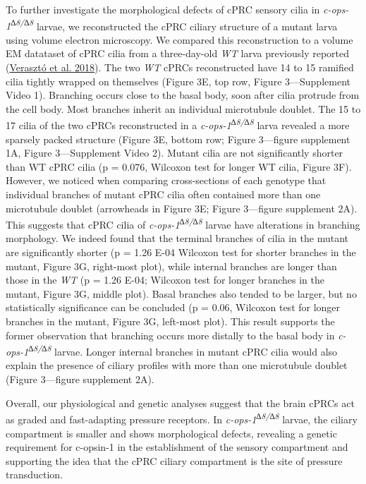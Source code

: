 \documentclass[
]{article}
\begin{document}
To further investigate the morphological defects of cPRC sensory cilia
in \emph{c-ops-1\textsuperscript{∆8/∆8}} larvae, we reconstructed the
cPRC ciliary structure of a mutant larva using volume electron
microscopy. We compared this reconstruction to a volume EM datataset of
cPRC cilia from a three-day-old \emph{WT} larva previously reported
(\protect\hyperlink{ref-veraszto2018}{Verasztó et al. 2018}). The two
\emph{WT} cPRCs reconstructed have 14 to 15 ramified cilia tightly
wrapped on themselves (Figure 3E, top row, Figure 3---Supplement Video
1). Branching occurs close to the basal body, soon after cilia protrude
from the cell body. Most branches inherit an individual microtubule
doublet. The 15 to 17 cilia of the two cPRCs reconstructed in a
\emph{c-ops-1\textsuperscript{∆8/∆8}} larva revealed a more sparsely
packed structure (Figure 3E, bottom row; Figure 3---figure supplement
1A, Figure 3---Supplement Video 2). Mutant cilia are not significantly
shorter than WT cPRC cilia (p = 0.076, Wilcoxon test for longer WT
cilia, Figure 3F). However, we noticed when comparing cross-sections of
each genotype that individual branches of mutant cPRC cilia often
contained more than one microtubule doublet (arrowheads in Figure 3E;
Figure 3---figure supplement 2A). This suggests that cPRC cilia of
\emph{c-ops-1\textsuperscript{∆8/∆8}} larvae have alterations in
branching morphology. We indeed found that the terminal branches of
cilia in the mutant are significantly shorter (p = 1.26 E-04 Wilcoxon
test for shorter branches in the mutant, Figure 3G, right-most plot),
while internal branches are longer than those in the \emph{WT} (p = 1.26
E-04; Wilcoxon test for longer branches in the mutant, Figure 3G, middle
plot). Basal branches also tended to be larger, but no statistically
significance can be concluded (p = 0.06, Wilcoxon test for longer
branches in the mutant, Figure 3G, left-most plot). This result supports
the former observation that branching occurs more distally to the basal
body in \emph{c-ops-1\textsuperscript{∆8/∆8}} larvae. Longer internal
branches in mutant cPRC cilia would also explain the presence of ciliary
profiles with more than one microtubule doublet (Figure 3---figure
supplement 2A).

Overall, our physiological and genetic analyses suggest that the brain
cPRCs act as graded and fast-adapting pressure receptors. In
\emph{c-ops-1\textsuperscript{∆8/∆8}} larvae, the ciliary compartment is
smaller and shows morphological defects, revealing a genetic requirement
for c-opsin-1 in the establishment of the sensory compartment and
supporting the idea that the cPRC ciliary compartment is the site of
pressure transduction.
\end{document}
